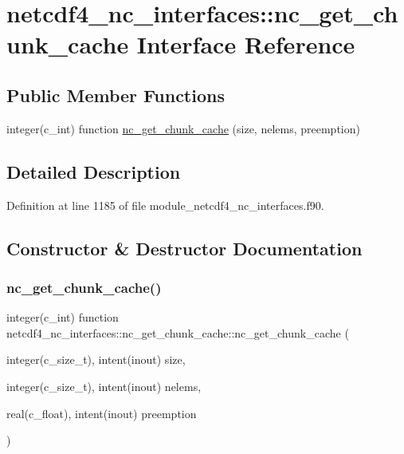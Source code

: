 \hypertarget{interfacenetcdf4__nc__interfaces_1_1nc__get__chunk__cache}{}\section{netcdf4\+\_\+nc\+\_\+interfaces\+:\+:nc\+\_\+get\+\_\+chunk\+\_\+cache Interface Reference}
\label{interfacenetcdf4__nc__interfaces_1_1nc__get__chunk__cache}
\subsection*{Public Member Functions}
\begin{DoxyCompactItemize}
\item 
integer(c\+\_\+int) function \hyperlink{interfacenetcdf4__nc__interfaces_1_1nc__get__chunk__cache_a6f9fe6dc5e0a360689eee9a62c580494}{nc\+\_\+get\+\_\+chunk\+\_\+cache} (size, nelems, preemption)
\end{DoxyCompactItemize}


\subsection{Detailed Description}


Definition at line 1185 of file module\+\_\+netcdf4\+\_\+nc\+\_\+interfaces.\+f90.



\subsection{Constructor \& Destructor Documentation}
\mbox{\label{interfacenetcdf4__nc__interfaces_1_1nc__get__chunk__cache_a6f9fe6dc5e0a360689eee9a62c580494}} 
\subsubsection{\texorpdfstring{nc\+\_\+get\+\_\+chunk\+\_\+cache()}{nc\_get\_chunk\_cache()}}
{\footnotesize\ttfamily integer(c\+\_\+int) function netcdf4\+\_\+nc\+\_\+interfaces\+::nc\+\_\+get\+\_\+chunk\+\_\+cache\+::nc\+\_\+get\+\_\+chunk\+\_\+cache (\begin{DoxyParamCaption}\item[{integer(c\+\_\+size\+\_\+t), intent(inout)}]{size,  }\item[{integer(c\+\_\+size\+\_\+t), intent(inout)}]{nelems,  }\item[{real(c\+\_\+float), intent(inout)}]{preemption }\end{DoxyParamCaption})}



